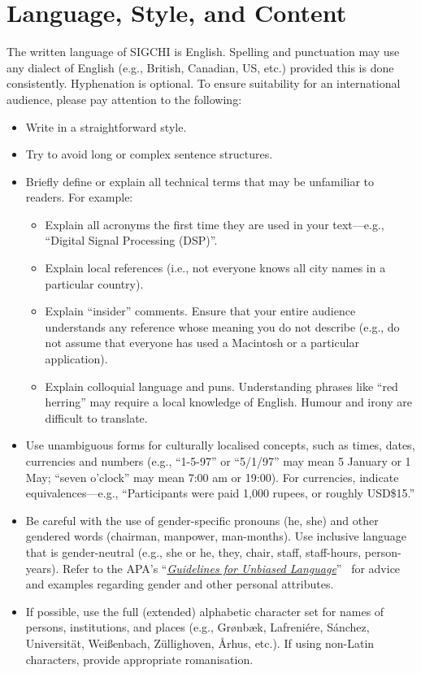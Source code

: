 \documentclass[preprint]{../latex/sigchi-modern}
\begin{document}
\section{Language, Style, and Content}
The written language of SIGCHI is English. Spelling and punctuation may use any
dialect of English (e.g., British, Canadian, US, etc.) provided this is done
consistently. Hyphenation is optional. To ensure suitability for an
international audience, please pay attention to the following:

\begin{itemize}
\item Write in a straightforward style.
\item Try to avoid long or complex sentence structures.
\item Briefly define or explain all technical terms that may be unfamiliar to
  readers. For example:
  \begin{itemize}
    \item Explain all acronyms the first time they are used in your text---e.g.,
      ``Digital Signal Processing (DSP)''.
    \item Explain local references (i.e., not everyone knows all city names in a
      particular country).
    \item Explain ``insider'' comments. Ensure that your entire audience
      understands any reference whose meaning you do not describe (e.g., do not
      assume that everyone has used a Macintosh or a particular application).
    \item Explain colloquial language and puns. Understanding phrases like ``red
      herring'' may require a local knowledge of English. Humour and irony are
      difficult to translate.
  \end{itemize}
\item Use unambiguous forms for culturally localised concepts, such as times,
  dates, currencies and numbers (e.g., ``1-5-97'' or ``5/1/97'' may mean 5
  January or 1 May; ``seven o'clock'' may mean 7:00 am or 19:00). For
  currencies, indicate equivalences---e.g., ``Participants were paid 1,000
  rupees, or roughly USD\$15.''
\item Be careful with the use of gender-specific pronouns (he, she) and other
  gendered words (chairman, manpower, man-months). Use inclusive language that
  is gender-neutral (e.g., she or he, they, chair, staff, staff-hours,
  person-years). Refer to the APA's
  ``\href{http://supp.apa.org/style/pubman-ch03.00.pdf}{\it Guidelines for 
  Unbiased Language}''~\cite{apa} for advice and examples regarding  gender and
  other personal attributes.
\item If possible, use the full (extended) alphabetic character set for names of
  persons, institutions, and places (e.g., Gr{\o}nb{\ae}k, Lafreni\'ere,
  S\'anchez, Universit{\"a}t, Wei{\ss}enbach, Z{\"u}llighoven, \r{A}rhus, etc.).
  If using non-Latin characters, provide appropriate romanisation.
\end{itemize}
\end{document}
